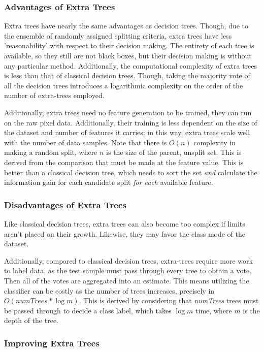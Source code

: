\subsubsection{Advantages of Extra Trees}

Extra trees have nearly the same advantages as decision trees. Though, due to the ensemble of randomly assigned splitting criteria, extra trees have less 'reasonability' with respect to their decision making. The entirety of each tree is available, so they still are not black boxes, but their decision making is without any particular method. Additionally, the computational complexity of extra trees is less than that of classical decision trees. Though, taking the majority vote of all the decision trees introduces a logarithmic complexity on the order of the number of extra-trees employed. 

Additionally, extra trees need no feature generation to be trained, they can run on the raw pixel data. Additionally, their training is less dependent on the size of the dataset and number of features it carries; in this way, extra trees scale well with the number of data samples. Note that there is $O(n)$ complexity in making a random split, where $n$ is the size of the parent, unsplit set. This is derived from the comparison that must be made at the feature value. This is better than a classical decision tree, which needs to sort the set \emph{and} calculate the information gain for each candidate split \emph{for each} available feature. 

\subsubsection{Disadvantages of Extra Trees}

Like classical decision trees, extra trees can also become too complex if limits aren't placed on their growth. Likewise, they may favor the class mode of the dataset. 

Additionally, compared to classical decision trees, extra-trees require more work to label data, as the test sample must pass through every tree to obtain a vote. Then all of the votes are aggregated into an estimate. This means utilizing the classifier can be costly as the number of trees increases, precisely in $O(numTrees\ast \log m)$. This is derived by considering that \textit{numTrees} trees must be passed through to decide a class label, which takes $\log m$ time, where $m$ is the depth of the tree.

\subsubsection{Improving Extra Trees}

